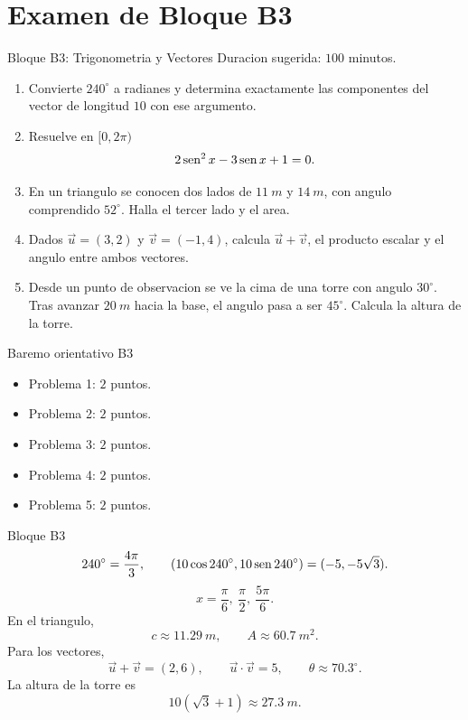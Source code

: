 \chapter{Examen de Bloque B3}

\begin{exambrief}{Bloque B3: Trigonometria y Vectores}
Duracion sugerida: \(100\) minutos.
\begin{enumerate}
  \item Convierte \(240^\circ\) a radianes y determina exactamente las componentes del vector de
  longitud \(10\) con ese argumento.
  \item Resuelve en \([0,2\pi)\)
  \[
  2\operatorname{sen}^2 x-3\operatorname{sen} x+1=0.
  \]
  \item En un triangulo se conocen dos lados de \(\SI{11}{m}\) y \(\SI{14}{m}\), con angulo
  comprendido \(52^\circ\). Halla el tercer lado y el area.
  \item Dados \(\vec u=(3,2)\) y \(\vec v=(-1,4)\), calcula \(\vec u+\vec v\), el producto
  escalar y el angulo entre ambos vectores.
  \item Desde un punto de observacion se ve la cima de una torre con angulo \(30^\circ\). Tras
  avanzar \(\SI{20}{m}\) hacia la base, el angulo pasa a ser \(45^\circ\). Calcula la altura de
  la torre.
\end{enumerate}
\end{exambrief}

\begin{rubricbox}{Baremo orientativo B3}
\begin{itemize}
  \item Problema 1: \(2\) puntos.
  \item Problema 2: \(2\) puntos.
  \item Problema 3: \(2\) puntos.
  \item Problema 4: \(2\) puntos.
  \item Problema 5: \(2\) puntos.
\end{itemize}
\end{rubricbox}

\begin{shortanswer}{Bloque B3}
\[
240^\circ=\frac{4\pi}{3},
\qquad
(10\cos240^\circ,10\operatorname{sen}240^\circ)=(-5,-5\sqrt3).
\]
\[
x=\frac{\pi}{6},\ \frac{\pi}{2},\ \frac{5\pi}{6}.
\]
En el triangulo,
\[
c\approx \SI{11.29}{m},
\qquad
A\approx \SI{60.7}{m^2}.
\]
Para los vectores,
\[
\vec u+\vec v=(2,6),
\qquad
\vec u\cdot \vec v=5,
\qquad
\theta\approx 70.3^\circ.
\]
La altura de la torre es
\[
10(\sqrt3+1)\approx \SI{27.3}{m}.
\]
\end{shortanswer}

